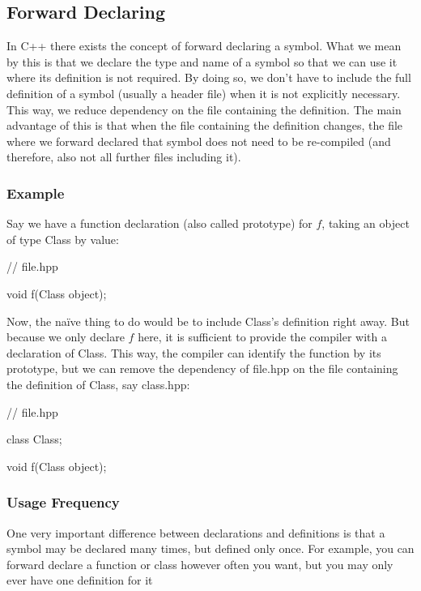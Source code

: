 \documentclass{report}
\begin{document}
\begin{concept}
    \bigbreak \noindent 
    \subsection{Forward Declaring}
    \bigbreak \noindent 
    In C++ there exists the concept of forward declaring a symbol. What we mean by this is that we declare the type and name of a symbol so that we can use it where its definition is not required. By doing so, we don’t have to include the full definition of a symbol (usually a header file) when it is not explicitly necessary. This way, we reduce dependency on the file containing the definition. The main advantage of this is that when the file containing the definition changes, the file where we forward declared that symbol does not need to be re-compiled (and therefore, also not all further files including it).
    \bigbreak \noindent 
    \subsubsection{Example}
    \bigbreak \noindent 
    Say we have a function declaration (also called prototype) for $f$, taking an object of type Class by value:
    \bigbreak \noindent 
    \begin{cppcode}
    // file.hpp

    void f(Class object);
    \end{cppcode}
    \bigbreak \noindent 
    Now, the naïve thing to do would be to include Class’s definition right away. But because we only declare $f$ here, it is sufficient to provide the compiler with a declaration of Class. This way, the compiler can identify the function by its prototype, but we can remove the dependency of file.hpp on the file containing the definition of Class, say class.hpp:
    \bigbreak \noindent 
    \begin{cppcode}
        // file.hpp

        class Class;

        void f(Class object);
    \end{cppcode}

    \bigbreak \noindent 
    \subsubsection{Usage Frequency}
    \bigbreak \noindent 
    One very important difference between declarations and definitions is that a symbol may be declared many times, but defined only once. For example, you can forward declare a function or class however often you want, but you may only ever have one definition for it


\end{concept}
\end{document}
